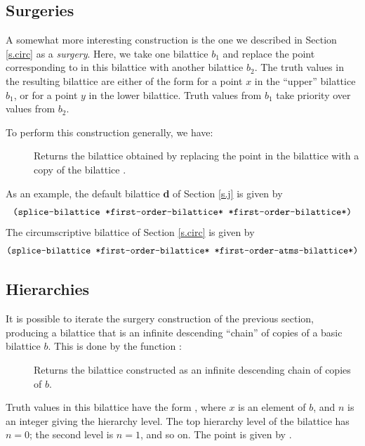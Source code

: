 \subsection{Surgeries}
\label{s.surgery}

A somewhat more interesting construction is the one we described in
Section \ref{s.circ} as a {\em surgery}.  Here, we take one bilattice
$b_1$ and replace the point corresponding to  in this
bilattice with another bilattice $b_2$.  The truth values in the
resulting bilattice are either of the form  for a point
$x$ in the ``upper'' bilattice $b_1$, or  for a point
$y$ in the lower bilattice.  Truth values from $b_1$ take priority over
values from $b_2$.

To perform this construction generally, we have: 
 \begin{description}
 \item [] Returns the bilattice
obtained by replacing the point  in the bilattice
 with a copy of the bilattice .
 \end{description}

As an example, the default bilattice {\bf d} of Section \ref{s.j} is
given by
 \[\mbox{\tt (splice-bilattice *first-order-bilattice* *first-order-bilattice*)}\]
 The circumscriptive bilattice of Section \ref{s.circ} is given by
 \[\mbox{\tt (splice-bilattice *first-order-bilattice*
*first-order-atms-bilattice*)}\]

\subsection{Hierarchies}

It is possible to iterate the surgery construction of the previous
section, producing a bilattice that is an infinite descending
``chain'' of copies of a basic bilattice $b$.  This is done by
the function :
 \begin{description}
 \item [] Returns the bilattice constructed
as an infinite descending chain of copies of $b$.
 \end{description}

Truth values in this bilattice have the form , where
$x$ is an element of $b$, and $n$ is an integer giving the hierarchy
level.  The top hierarchy level of the bilattice has $n=0$; the
second level is $n=1$, and so on.  The point  is given
by \NIL.

